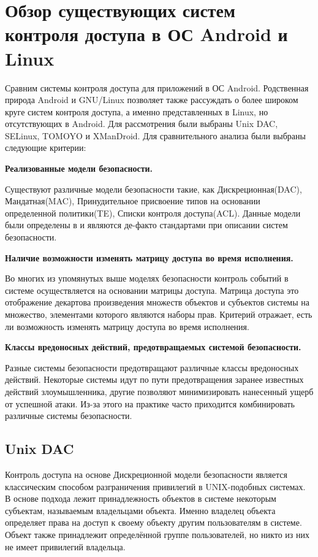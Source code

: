 \section{Обзор существующих систем контроля доступа в ОС Android и Linux}

\bigskip
Сравним системы контроля доступа для приложений в ОС Android.
Родственная природа Android и GNU/Linux позволяет также рассуждать о
более широком круге систем контроля доступа, а именно представленных в
Linux, но отсутствующих в Android. Для рассмотрения были выбраны Unix
DAC, SELinux, TOMOYO и XManDroid. Для сравнительного анализа были
выбраны следующие критерии:

\bigskip
{\bfseries Реализованные модели безопасности.} 

    Существуют различные модели безопасности такие, как
    Дискреционная(DAC), Мандатная(MAC), Принудительное присвоение типов
    на основании определенной политики(TE), Списки контроля
    доступа(ACL).  Данные модели были определены в \cite{orangebook} и
    являются де-факто стандартами при описании систем безопасности.

\bigskip
{\bfseries Наличие возможности изменять матрицу доступа 
	во время исполнения.}
	
    Во многих из упомянутых выше моделях безопасности контроль событий в
    системе осуществляется на основании матрицы доступа. Матрица доступа
    это отображение декартова произведения множеств объектов и субъектов
    системы на множество, элементами которого являются наборы прав.
    Критерий отражает, есть ли возможность изменять матрицу доступа во
    время исполнения. 

\bigskip
{\bfseries Классы вредоносных действий, предотвращаемых 
	системой безопасности.}
	
    Разные системы безопасности предотвращают различные классы
    вредоносных действий. Некоторые системы идут по пути предотвращения
    заранее известных действий злоумышленника, другие позволяют
    минимизировать нанесенный ущерб от успешной атаки. Из-за этого на
    практике часто приходится комбинировать различные системы
    безопасности.    

\bigskip
\subsection{Unix DAC} 
Контроль доступа на основе Дискреционной модели безопасности является
классическим способом разграничения привилегий в UNIX-подобных системах.
В основе подхода лежит принадлежность объектов в системе некоторым
субъектам, называемым владельцами объекта. Именно владелец объекта 
определяет права на доступ к своему объекту другим пользователям в
системе. Объект также принадлежит определённой группе пользователей, но
никто из них не имеет привилегий владельца.

